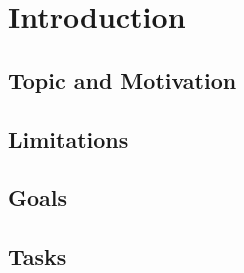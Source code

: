  \newpage
\section{Introduction}  %

\subsection{Topic and Motivation} %

\subsection{Limitations}


\subsection{Goals}

\subsection{Tasks}

\pagebreak

